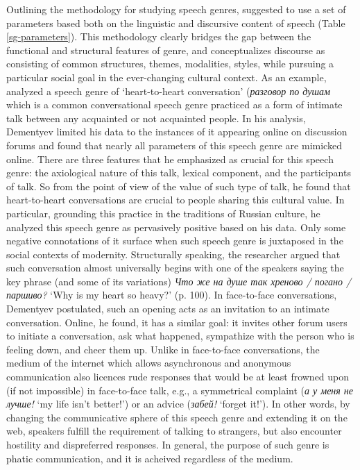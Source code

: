 \documentclass[12pt, draft]{article}
\begin{document}
Outlining the methodology for studying speech genres, \textcite{dementyev2015} suggested to use a set of parameters based both on the linguistic and discursive content of speech (Table \ref{sg-parameters}). This methodology clearly bridges the gap between the functional and structural features of genre, and conceptualizes discourse as consisting of common structures, themes, modalities, styles, while pursuing a particular social goal in the ever-changing cultural context. As an example, \textcite{dementyev2015} analyzed a speech genre of `heart-to-heart conversation' (\foreignlanguage{russian}{\textit{разговор по душам}} which is a common conversational speech genre practiced as a form of intimate talk between any acquainted or not acquainted people. In his analysis, Dementyev limited his data to the instances of it appearing online on discussion forums and found that nearly all parameters of this speech genre are mimicked online. There are three features that he emphasized as crucial for this speech genre: the axiological nature of this talk, lexical component, and the participants of talk. So from the point of view of the value of such type of talk, he found that heart-to-heart conversations are crucial to people sharing this cultural value. In particular, grounding this practice in the traditions of Russian culture, he analyzed this speech genre as pervasively positive based on his data. Only some negative connotations of it surface when such speech genre is juxtaposed in the social contexts of modernity. Structurally speaking, the researcher argued that such conversation almost universally begins with one of the speakers saying the key phrase (and some of its variations) \foreignlanguage{russian}{\textit{Что же на душе так хреново / погано / паршиво?}} `Why is my heart so heavy?' (p. 100). In face-to-face conversations, Dementyev postulated, such an opening acts as an invitation to an intimate conversation. Online, he found, it has a similar goal: it invites other forum users to initiate a conversation, ask what happened, sympathize with the person who is feeling down, and cheer them up. Unlike in face-to-face conversations, the medium of the internet which allows asynchronous and anonymous communication also licences rude responses that would be at least frowned upon (if not impossible) in face-to-face talk, e.g., a symmetrical complaint (\foreignlanguage{russian}{\textit{а у меня не лучше!} `my life isn't better!'}) or an advice (\foreignlanguage{russian}{\textit{забей!}} `forget it!'). In other words, by changing the communicative sphere of this speech genre and extending it on the web, speakers fulfill the requirement of talking to strangers, but also encounter hostility and dispreferred responses. In general, the purpose of such genre is phatic communication, and it is acheived regardless of the medium.
\end{document}
